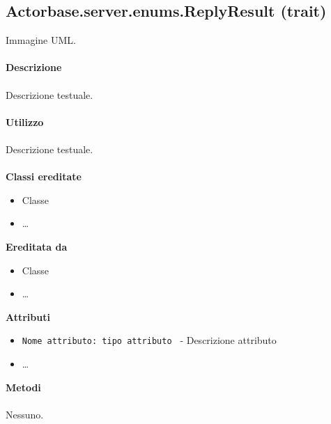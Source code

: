 \documentclass[a4paper]{article}
\begin{document}
	\subsection{Actorbase.server.enums.ReplyResult (trait)}
		Immagine UML.
		\\ \\
		\textbf{Descrizione}
			\\ \\
			Descrizione testuale.
			\\ \\
		\textbf{Utilizzo}
			\\ \\
			Descrizione testuale.
			\\ \\
		\textbf{Classi ereditate}
			\begin{itemize}
				\item Classe
				\item \dots
			\end{itemize}
		\textbf{Ereditata da}
			\begin{itemize}
				\item Classe
				\item \dots
			\end{itemize}
		\textbf{Attributi}
			\begin{itemize}
				\item \texttt{Nome attributo: tipo attributo } - Descrizione attributo
				\item \dots
			\end{itemize}
		\textbf{Metodi}
			\\ \\
			Nessuno.
			
\end{document}
